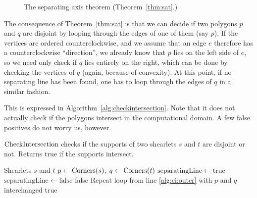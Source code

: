 \begin{figure}
\centering
{}
\caption{The separating axis theorem (Theorem~\ref{thm:sat}.)} \label{fig:sat}
\end{figure}

The consequence of Theorem~\ref{thm:sat} is that we can decide if two polygons $p$ and $q$ are disjoint by
looping through the edges of one of them (say $p$). If the vertices are ordered counterclockwise, and we
assume that an edge $e$ therefore has a counterclockwise ``direction'', we already know that $p$ lies on the
left side of $e$, so we need only check if $q$ lies entirely on the right, which can be done by checking the
vertices of $q$ (again, because of convexity). At this point, if no separating line has been found, one has to
loop through the edges of $q$ in a similar fashion.

This is expressed in Algorithm~\ref{alg:checkintersection}. Note that it does not actually check if the
polygons intersect in the computational domain. A few false positives do not worry us, however.

\begin{algorithm}
\caption{$\operatorname{CheckIntersection}$ checks if the supports of two shearlets $s$ and $t$ are disjoint or not. Returns
true if the supports intersect.}
\label{alg:checkintersection}
\begin{algorithmic}[1]
\REQUIRE Shearlets $s$ and $t$
\STATE $p\leftarrow\operatorname{Corners}(s)$, $q\leftarrow\operatorname{Corners}(t)$
 \label{alg:ci:outer}
\STATE $\text{separatingLine}\leftarrow\mathrm{true}$
\STATE $\text{separatingLine}\leftarrow\mathrm{false}$
\BREAK
\ENDIF
\ENDFOR
{}
\RETURN false
\ENDIF
\ENDFOR
\STATE Repeat loop from line \ref{alg:ci:outer} with $p$ and $q$ interchanged
\RETURN true
\end{algorithmic}
\end{algorithm}

